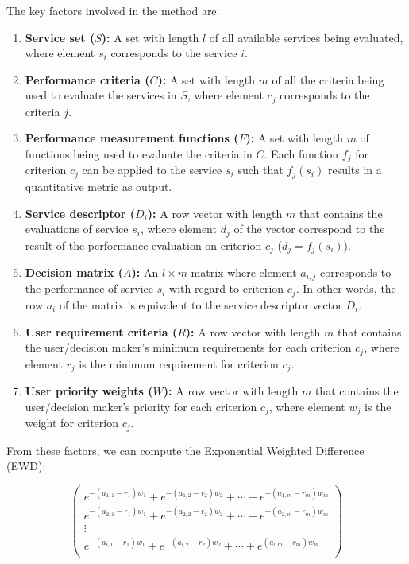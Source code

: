 The key factors involved in the method are:

\begin{enumerate}
\def\labelenumi{\arabic{enumi}.}
\tightlist
\item
  \textbf{Service set (\(S\)):} A set with length \(l\) of all available
  services being evaluated, where element \(s_i\) corresponds to the
  service \(i\).
\item
  \textbf{Performance criteria (\(C\)):} A set with length \(m\) of all
  the criteria being used to evaluate the services in \(S\), where
  element \(c_j\) corresponds to the criteria \(j\).
\item
  \textbf{Performance measurement functions (\(F\)):} A set with length
  \(m\) of functions being used to evaluate the criteria in \(C\). Each
  function \(f_j\) for criterion \(c_j\) can be applied to the service
  \(s_i\) such that \(f_j(s_i)\) results in a quantitative metric as
  output.
\item
  \textbf{Service descriptor (\(D_i\)):} A row vector with length \(m\)
  that contains the evaluations of service \(s_i\), where element
  \(d_j\) of the vector correspond to the result of the performance
  evaluation on criterion \(c_j\) (\(d_j=f_j(s_i)\)).
\item
  \textbf{Decision matrix (\(A\)):} An \(l \times m\) matrix where
  element \(a_{i,j}\) corresponds to the performance of service \(s_i\)
  with regard to criterion \(c_j\). In other words, the row \(a_i\) of
  the matrix is equivalent to the service descriptor vector \(D_i\).
\item
  \textbf{User requirement criteria (\(R\)):} A row vector with length
  \(m\) that contains the user/decision maker's minimum requirements for
  each criterion \(c_j\), where element \(r_j\) is the minimum
  requirement for criterion \(c_j\).
\item
  \textbf{User priority weights (\(W\)):} A row vector with length \(m\)
  that contains the user/decision maker's priority for each criterion
  \(c_j\), where element \(w_j\) is the weight for criterion \(c_j\).
\end{enumerate}

From these factors, we can compute the Exponential Weighted Difference
(EWD):

\[
\begin{pmatrix}
e^{-(a_{1,1} - r_1)w_1} + e^{-(a_{1,2} - r_2)w_2} + \cdots + e^{-(a_{1,m} - r_m)w_m} \\
e^{-(a_{2,1} - r_1)w_1} + e^{-(a_{2,2} - r_2)w_2} + \cdots + e^{-(a_{2,m} - r_m)w_m} \\
\vdots \\
e^{-(a_{l,1} - r_1)w_1} + e^{-(a_{l,2} - r_2)w_2} + \cdots + e^{(a_{l,m} - r_m)w_m} \\
\end{pmatrix}
\]

